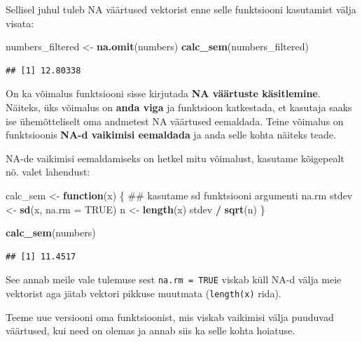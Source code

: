 \documentclass[]{book}
\newenvironment{Shaded}{\begin{snugshade}}{\end{snugshade}}
\newcommand{\KeywordTok}[1]{\textcolor[rgb]{0.13,0.29,0.53}{\textbf{#1}}}
\newcommand{\DataTypeTok}[1]{\textcolor[rgb]{0.13,0.29,0.53}{#1}}
\newcommand{\StringTok}[1]{\textcolor[rgb]{0.31,0.60,0.02}{#1}}
\newcommand{\OtherTok}[1]{\textcolor[rgb]{0.56,0.35,0.01}{#1}}
\newcommand{\ControlFlowTok}[1]{\textcolor[rgb]{0.13,0.29,0.53}{\textbf{#1}}}
\newcommand{\OperatorTok}[1]{\textcolor[rgb]{0.81,0.36,0.00}{\textbf{#1}}}
\newcommand{\NormalTok}[1]{#1}
\begin{document}
Sellisel juhul tuleb NA väärtused vektorist enne selle funktsiooni
kasutamist välja visata:

\begin{Shaded}
\begin{Highlighting}[]
\NormalTok{numbers_filtered <-}\StringTok{ }\KeywordTok{na.omit}\NormalTok{(numbers)}
\KeywordTok{calc_sem}\NormalTok{(numbers_filtered)}
\end{Highlighting}
\end{Shaded}

\begin{verbatim}
## [1] 12.80338
\end{verbatim}

On ka võimalus funktsiooni sisse kirjutada \textbf{NA väärtuste
käsitlemine}. Näiteks, üks võimalus on \textbf{anda viga} ja funktsioon
katkestada, et kasutaja saaks ise ühemõtteliselt oma andmetest NA
väärtused eemaldada. Teine võimalus on funktsioonis \textbf{NA-d
vaikimisi eemaldada} ja anda selle kohta näiteks teade.

NA-de vaikimisi eemaldamiseks on hetkel mitu võimalust, kasutame
kõigepealt nö. valet lahendust:

\begin{Shaded}
\begin{Highlighting}[]
\NormalTok{calc_sem <-}\StringTok{ }\ControlFlowTok{function}\NormalTok{(x) \{}
\NormalTok{  ## kasutame sd funktsiooni argumenti na.rm}
\NormalTok{  stdev <-}\StringTok{ }\KeywordTok{sd}\NormalTok{(x, }\DataTypeTok{na.rm =} \OtherTok{TRUE}\NormalTok{)}
\NormalTok{  n <-}\StringTok{ }\KeywordTok{length}\NormalTok{(x)}
\NormalTok{  stdev }\OperatorTok{/}\StringTok{ }\KeywordTok{sqrt}\NormalTok{(n)}
\NormalTok{\}}

\KeywordTok{calc_sem}\NormalTok{(numbers)}
\end{Highlighting}
\end{Shaded}

\begin{verbatim}
## [1] 11.4517
\end{verbatim}

See annab meile vale tulemuse sest \texttt{na.rm\ =\ TRUE} viskab küll
NA-d välja meie vektorist aga jätab vektori pikkuse muutmata
(\texttt{length(x)} rida).

Teeme uue versiooni oma funktsioonist, mis viskab vaikimisi välja
puuduvad väärtused, kui need on olemas ja annab siis ka selle kohta
hoiatuse.
\end{document}

